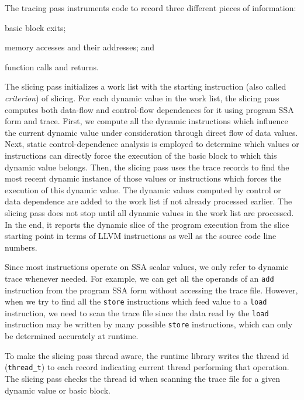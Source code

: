 \documentclass[DIV=calc, paper=a4, fontsize=11pt, twocolumn]{scrartcl}
\begin{document}
The tracing pass instruments code to record three different pieces of information:
\begin{inparaenum}[\itshape 1\upshape)]
	\item basic block exits;
	\item memory accesses and their addresses; and
	\item function calls and returns.
\end{inparaenum}
The slicing pass initializes a work list with the starting instruction (also called \emph{criterion}) of slicing.
For each dynamic value in the work list,
the slicing pass computes both data-flow and control-flow dependences for it using program SSA form and trace. First, we compute all the dynamic instructions which influence the current dynamic value under consideration through direct flow of data values.
Next, static control-dependence analysis is employed to determine which values or instructions can directly force the execution of the basic block to which this dynamic value belongs.
Then, the slicing pass uses the trace records to find the most recent dynamic instance of those values or instructions which forces the execution of this dynamic value.
The dynamic values computed by control or data dependence are added to the work list if not already processed earlier.
The slicing pass does not stop until all dynamic values in the work list are processed.
In the end, it reports the dynamic slice of the program execution from the slice starting point in terms of LLVM instructions as well as the source code line numbers.

Since most instructions operate on SSA scalar values, we only refer to dynamic trace whenever needed.
For example, we can get all the operands of an \texttt{add} instruction from the program SSA form without accessing the trace file.
However, when we try to find all the \texttt{store} instructions which feed value to a \texttt{load} instruction,
we need to scan the trace file since the data read by the \texttt{load} instruction may be written by many possible \texttt{store} instructions,
which can only be determined accurately at runtime.

To make the slicing pass thread aware,
the runtime library writes the thread id (\texttt{thread\_t}) to each record indicating current thread performing that operation.
The slicing pass checks the thread id when scanning the trace file for a given dynamic value or basic block.

\end{document}
